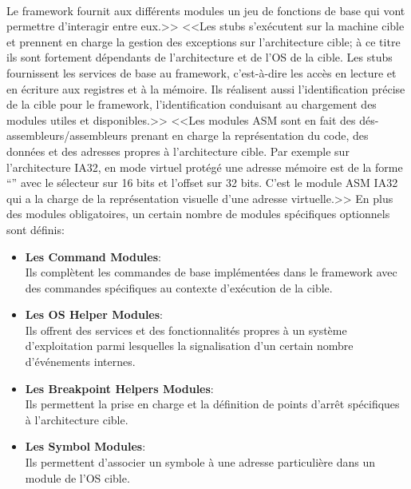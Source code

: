 \documentclass[11pt, book, english, french, standardlists]{upmethodology-document}
\begin{document}
				\paragraph*{}
					Le framework fournit aux différents modules un jeu de fonctions de base qui vont permettre d'interagir entre eux.>>\cite{SSTICGenDbg}
					<<Les stubs s'exécutent sur la machine cible et prennent en charge la gestion des exceptions sur l'architecture cible; à ce titre ils sont fortement dépendants de l'architecture et de l'OS de la cible. Les stubs fournissent les services de base au framework, c'est-à-dire les accès en lecture et en écriture aux registres et à la mémoire. Ils réalisent aussi l'identification précise de la cible pour le framework, l'identification conduisant au chargement des modules utiles et disponibles.>>\cite{SSTICGenDbg}
					<<Les modules ASM sont en fait des dés-assembleurs/assembleurs prenant en charge la représentation du code, des données et des adresses propres à l'architecture cible. Par exemple sur l'architecture IA32, en mode virtuel protégé une adresse mémoire est de la forme ``'' avec le sélecteur sur 16 bits et l'offset sur 32 bits. C'est le module ASM IA32 qui a la charge de la représentation visuelle d'une adresse virtuelle.>>\cite{SSTICGenDbg}
					En plus des modules obligatoires, un certain nombre de modules spécifiques optionnels sont définis:
					\begin{itemize}
						\item \textbf{Les Command Modules}:\\
							Ils complètent les commandes de base implémentées dans le framework avec des commandes spécifiques au contexte d'exécution de la cible.
						\item \textbf{Les OS Helper Modules}:\\
							Ils offrent des services et des fonctionnalités propres à un système d'exploitation parmi lesquelles la signalisation d'un certain nombre d'événements internes.
						\item \textbf{Les Breakpoint Helpers Modules}:\\
							Ils permettent la prise en charge et la définition de points d'arrêt spécifiques à l'architecture cible.
						\item \textbf{Les Symbol Modules}:\\
							Ils permettent d'associer un symbole à une adresse particulière dans un module de l'OS cible.
					\end{itemize}
\end{document}
